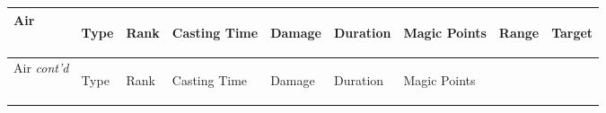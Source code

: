 \documentclass[twoside]{book}
\begin{document}
\begin{longtable}{p{1.25in}lp{2em}p{3em}llp{7em}ll} 
  Air
  &
  \begin{turn}{70}{Type}\end{turn}
          
  &
  \begin{turn}{70}{Rank}\end{turn}
          
  &
  \begin{turn}{70}{Casting Time}\end{turn}
          
  &
  \begin{turn}{70}{Damage}\end{turn}
          
  &
  \begin{turn}{70}{Duration}\end{turn}
          
  &
  \begin{turn}{70}{Magic Points}\end{turn}
          
  &
  \begin{turn}{70}{Range}\end{turn}
          
  &
  \begin{turn}{70}{Target}\end{turn}
          
  \\
  \hline
  \hline
  \endfirsthead
  Air \textit{cont'd}
        
  &
  \begin{turn}{70}{Type}\end{turn}
          
  &
  \begin{turn}{70}{Rank}\end{turn}
          
  &
  \begin{turn}{70}{Casting Time}\end{turn}
          
  &
  \begin{turn}{70}{Damage}\end{turn}
          
  &
  \begin{turn}{70}{Duration}\end{turn}
          
  &
  \begin{turn}{70}{Magic Points}\end{turn}
          

\end{longtable}
\end{document}
